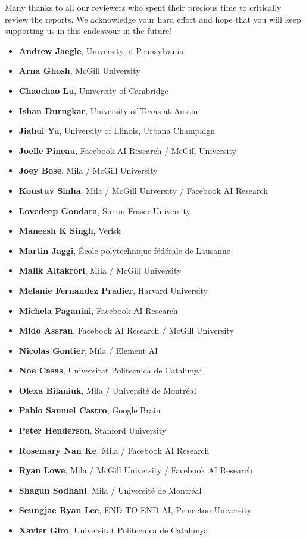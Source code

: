 Many thanks to all our reviewers who spent their precious time to critically review the reports. We acknowledge your hard effort and hope that you will keep supporting us in this endeavour in the future!  

\begin{itemize}
    \item \textbf{Andrew Jaegle}, University of Pennsylvania
    \item \textbf{Arna Ghosh}, McGill University
    \item \textbf{Chaochao Lu}, University of Cambridge
    \item \textbf{Ishan Durugkar}, University of Texas at Austin
    \item \textbf{Jiahui Yu}, University of Illinois, Urbana Champaign
    \item \textbf{Joelle Pineau}, Facebook AI Research / McGill University
    \item \textbf{Joey Bose}, Mila / McGill University
    \item \textbf{Koustuv Sinha}, Mila / McGill University / Facebook AI Research
    \item \textbf{Lovedeep Gondara}, Simon Fraser University
    \item \textbf{Maneesh K Singh}, Verisk
    \item \textbf{Martin Jaggi}, École polytechnique fédérale de Lausanne
    \item \textbf{Malik Altakrori}, Mila / McGill University
    \item \textbf{Melanie Fernandez Pradier}, Harvard University
    \item \textbf{Michela Paganini}, Facebook AI Research
    \item \textbf{Mido Assran}, Facebook AI Research / McGill University
    \item \textbf{Nicolas Gontier}, Mila / Element AI
    \item \textbf{Noe Casas}, Universitat Politecnica de Catalunya
    \item \textbf{Olexa Bilaniuk}, Mila / Université de Montréal
    \item \textbf{Pablo Samuel Castro}, Google Brain
    \item \textbf{Peter Henderson}, Stanford University
    \item \textbf{Rosemary Nan Ke}, Mila / Facebook AI Research
    \item \textbf{Ryan Lowe}, Mila / McGill University / Facebook AI Research
    \item \textbf{Shagun Sodhani}, Mila / Université de Montréal
    \item \textbf{Seungjae Ryan Lee}, END-TO-END AI, Princeton University
    \item \textbf{Xavier Giro}, Universitat Politecnica de Catalunya
\end{itemize}


